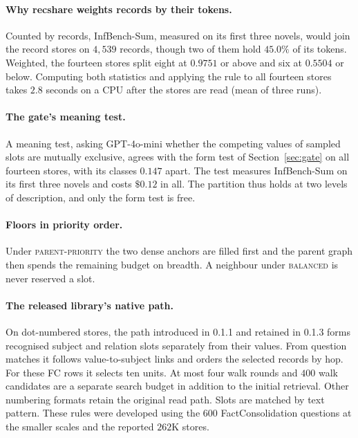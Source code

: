 \documentclass{article}
\newcommand{\cov}{\textsf{recshare}}
\newcommand{\balanced}{\textsc{balanced}}
\newcommand{\parprio}{\textsc{parent-priority}}
\begin{document}
\paragraph{Why \cov{} weights records by their tokens.} Counted by records, InfBench-Sum, measured on its first three novels, would join the record stores on $4{,}539$ records, though two of them hold $45.0\%$ of its tokens. Weighted, the fourteen stores split eight at $0.9751$ or above and six at $0.5504$ or below. Computing both statistics and applying the rule to all fourteen stores takes $2.8$ seconds on a CPU after the stores are read (mean of three runs).

\paragraph{The gate's meaning test.} A meaning test, asking GPT-4o-mini whether the competing values of sampled slots are mutually exclusive, agrees with the form test of Section~\ref{sec:gate} on all fourteen stores, with its classes $0.147$ apart. The test measures InfBench-Sum on its first three novels and costs $\$0.12$ in all. The partition thus holds at two levels of description, and only the form test is free.

\paragraph{Floors in priority order.} Under \parprio{} the two dense anchors are filled first and the parent graph then spends the remaining budget on breadth. A neighbour under \balanced{} is never reserved a slot.

\paragraph{The released library's native path.} On dot-numbered stores, the path introduced in 0.1.1 and retained in 0.1.3 forms recognised subject and relation slots separately from their values. From question matches it follows value-to-subject links and orders the selected records by hop. For these FC rows it selects ten units. At most four walk rounds and $400$ walk candidates are a separate search budget in addition to the initial retrieval. Other numbering formats retain the original read path. Slots are matched by text pattern. These rules were developed using the $600$ FactConsolidation questions at the smaller scales and the reported $262$K stores.
\end{document}
